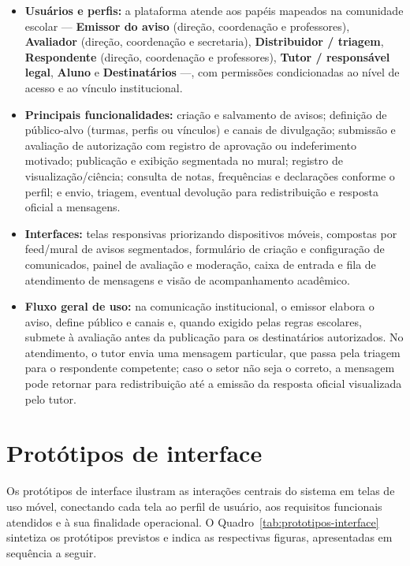 \documentclass[a4paper,12pt]{report}
\begin{document}
\begin{itemize}
    \item \textbf{Usuários e perfis:} a plataforma atende aos papéis mapeados na comunidade escolar — \textbf{Emissor do aviso} (direção, coordenação e professores), \textbf{Avaliador} (direção, coordenação e secretaria), \textbf{Distribuidor / triagem}, \textbf{Respondente} (direção, coordenação e professores), \textbf{Tutor / responsável legal}, \textbf{Aluno} e \textbf{Destinatários} —, com permissões condicionadas ao nível de acesso e ao vínculo institucional.
    \item \textbf{Principais funcionalidades:} criação e salvamento de avisos; definição de público-alvo (turmas, perfis ou vínculos) e canais de divulgação; submissão e avaliação de autorização com registro de aprovação ou indeferimento motivado; publicação e exibição segmentada no mural; registro de visualização/ciência; consulta de notas, frequências e declarações conforme o perfil; e envio, triagem, eventual devolução para redistribuição e resposta oficial a mensagens.
    \item \textbf{Interfaces:} telas responsivas priorizando dispositivos móveis, compostas por feed/mural de avisos segmentados, formulário de criação e configuração de comunicados, painel de avaliação e moderação, caixa de entrada e fila de atendimento de mensagens e visão de acompanhamento acadêmico.
    \item \textbf{Fluxo geral de uso:} na comunicação institucional, o emissor elabora o aviso, define público e canais e, quando exigido pelas regras escolares, submete à avaliação antes da publicação para os destinatários autorizados. No atendimento, o tutor envia uma mensagem particular, que passa pela triagem para o respondente competente; caso o setor não seja o correto, a mensagem pode retornar para redistribuição até a emissão da resposta oficial visualizada pelo tutor.
\end{itemize}

\section{Protótipos de interface}

Os protótipos de interface ilustram as interações centrais do sistema em telas de uso móvel, conectando cada tela ao perfil de usuário, aos requisitos funcionais atendidos e à sua finalidade operacional. O Quadro~\ref{tab:prototipos-interface} sintetiza os protótipos previstos e indica as respectivas figuras, apresentadas em sequência a seguir.
\end{document}
